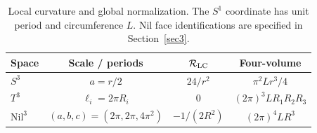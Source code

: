 \begin{table}[htbp]
\centering
\small
\caption{Local curvature and global normalization. The $S^1$ coordinate has unit period and circumference $L$. Nil face identifications are specified in Section~\ref{sec3}.}\label{tab:v3:1}
\setlength{\tabcolsep}{4pt}
\renewcommand{\arraystretch}{1.25}
\begin{tabular}{lccc}
\toprule
Space & Scale / periods & $\mathcal R_{\rm LC}$ & Four-volume \\
\midrule
$S^3$ & $a=r/2$ & $24/r^2$ & $\pi^2Lr^3/4$ \\
$T^3$ & $\ell_i=2\pi R_i$ & $0$ & $(2\pi)^3LR_1R_2R_3$ \\
$\mathrm{Nil}^3$ & $(a,b,c)=(2\pi,2\pi,4\pi^2)$ & $-1/(2R^2)$ & $(2\pi)^4LR^3$ \\
\bottomrule
\end{tabular}
\end{table}
